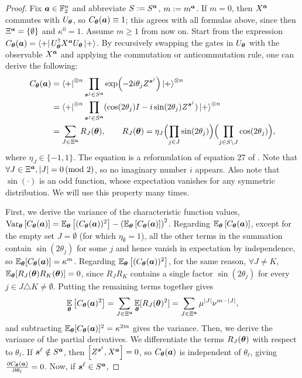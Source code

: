 \documentclass{article}
\theoremstyle{plain}
\theoremstyle{definition}
\theoremstyle{remark}
\begin{document}
\begin{proof}
Fix ${\bm{a}}\in\mathbb{F}_2^n$ and abbreviate $S:=S^{\bm{a}}$, $m:=m^{\bm{a}}$. If $m=0$, then $X^{\bm{a}}$ commutes with $U_{\bm{\theta}}$, so $C_{\bm{\theta}}({\bm{a}})\equiv 1$; this agrees with all formulas above, since then $\Xi^{\bm{a}}=\{\emptyset\}$ and $\kappa^{0}=1$. Assume $m\geq 1$ from now on. Start from the expression $C_{\bm{\theta}}({\bm{a}})=\bra{+} U_{\bm{\theta}}^\dagger X^{{\bm{a}}}U_{\bm{\theta}}\ket{+}
$. By recursively swapping the gates in $U_{\bm{\theta}}$ with the observable $X^{{\bm{a}}}$ and applying the commutation or anticommutation rule, one can derive the following:
\begin{align*}
C_{\bm{\theta}}({\bm{a}})
&= \bra{+}^{\otimes n} \prod_{{\bm{s}^j}\in S^{\bm{a}}} \exp(-2i\theta_jZ^{\bm{s}^j}) \ket{+}^{\otimes n} \\
&= \bra{+}^{\otimes n} \prod_{{\bm{s}^j}\in S^{\bm{a}}} (\cos(2\theta_j)I - i \sin(2\theta_j)Z^{\bm{s}^j}) \ket{+}^{\otimes n}  \\
&= \sum_{J\in\Xi^{\bm{a}}} R_J({\bm{\theta}}), \qquad R_J({\bm{\theta}})=\eta_J 
\Bigl(\prod_{j\in J} \sin(2\theta_j)\Bigr)\Bigl(\prod_{j\in S\setminus J}\cos(2\theta_j)\Bigr),
\end{align*}
where $\eta_J \in \{-1,1\}$. The equation is a reformulation of equation 27 of \cite{recioarmengol25}. Note that $\forall J \in \Xi^{\bm{a}}, \abs{J} = 0 \, (\text{mod 2})$, so no imaginary number $i$ appears. Also note that $\sin(\cdot)$ is an odd function, whose expectation vanishes for any symmetric distribution. We will use this property many times.

First, we derive the variance of the characteristic function values, $\operatorname*{Var}_{\bm{\theta}} \left[ C_{\bm{\theta}}({\bm{a}}) \right] = \operatorname*{\mathbb{E}}_{\bm{\theta}} \left[ (C_{\bm{\theta}}({\bm{a}}))^2\right] - \left(\operatorname*{\mathbb{E}}_{\bm{\theta}} \left[ C_{\bm{\theta}}({\bm{a}}) \right]\right)^2$. Regarding $\operatorname*{\mathbb{E}}_{\bm{\theta}} \left[ C_{\bm{\theta}}({\bm{a}}) \right]$, except for the empty set $J = \emptyset$ (for which $\eta_\emptyset=1$), all the other terms in the summation contain $\sin(2\theta_j)$ for some $j$ and hence vanish in expectation by independence, so $\operatorname*{\mathbb{E}}_{\bm{\theta}}[C_{\bm{\theta}}({\bm{a}})]=\kappa^{m}$. Regarding $\operatorname*{\mathbb{E}}_{\bm{\theta}} \left[ (C_{\bm{\theta}}({\bm{a}}))^2\right]$, for the same reason, $\forall J \neq K$,  $\operatorname*{\mathbb{E}}_{{\bm{\theta}}}[R_J({\bm{\theta}})R_K({\bm{\theta}})] = 0$, since $R_JR_K$ contains a single factor $\sin(2\theta_j)$ for every $j\in J\triangle K\neq\emptyset$. Putting the remaining terms together gives
\begin{equation*}
     \operatorname*{\mathbb{E}}_{\bm{\theta}} \left[ C_{\bm{\theta}}({\bm{a}})^2 \right] = \sum_{J \in \Xi^{\bm{a}}} \operatorname*{\mathbb{E}}_{\bm{\theta}}[R_J({\bm{\theta}})^2] = \sum_{J \in \Xi^{\bm{a}}} \mu^{\abs{J}} \nu^{m-\abs{J}},
\end{equation*}
and subtracting $\operatorname*{\mathbb{E}}_{\bm{\theta}}[C_{\bm{\theta}}({\bm{a}})]^2=\kappa^{2m}$ gives the variance.
Then, we derive the variance of the partial derivatives. We differentiate the terms $R_J({\bm{\theta}})$ with respect to $\theta_\ell$. If ${\bm{s}^\ell} \notin S^{\bm{a}}$, then $\comm{Z^{\vtsl}}{X^\vta}=0$, so $C_{\bm{\theta}}({\bm{a}})$ is independent of $\theta_\ell$, giving $\frac{\partial C_{\bm{\theta}}({\bm{a}})}{\partial \theta_\ell}=0$. Now, if ${\bm{s}^\ell} \in S^{\bm{a}}$,


\end{proof}
\end{document}
